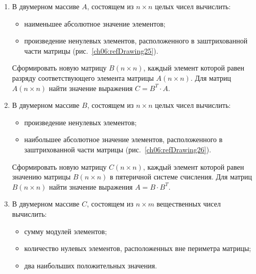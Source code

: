 \begin{enumerate}


\item В двумерном массиве $A$, состоящем из $n\times n$ целых чисел вычислить:

\begin{itemize}
\item наименьшее абсолютное значение элементов;
\item произведение ненулевых элементов, расположенного в заштрихованной части матрицы (рис.~\ref{ch06:refDrawing25}).
\end{itemize}

Сформировать новую матрицу $B(n\times n)$, каждый элемент которой равен разряду
соответствующего элемента матрицы $A(n\times n)$. Для матриц $A(n\times n)$ найти
значение выражения  $C=B^T\cdot A$.



\item В двумерном массиве $B$, состоящем из $n\times n$ целых чисел вычислить:

\begin{itemize}
\item произведение ненулевых элементов;
\item наибольшее абсолютное значение элементов, расположенного в заштрихованной 
части матрицы (рис.~\ref{ch06:refDrawing26}).
\end{itemize}

Сформировать новую матрицу $C(n\times n)$, каждый элемент которой равен значению матрицы
$B(n\times n)$ в пятеричной системе счисления. Для матриц $B(n\times n)$ найти
значение выражения  $A=B\cdot B^T$.



\item В двумерном массиве $C$, состоящем из $n\times m$ вещественных чисел вычислить:

\begin{itemize}
\item сумму модулей элементов;
\item количество нулевых элементов, расположенных вне периметра матрицы;
\item два наибольших положительных значения.
\end{itemize}


\end{enumerate}
